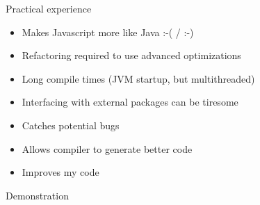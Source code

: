 \documentclass{powerdot}
\begin{document}
\begin{slide}{Practical experience}
\begin{itemize}
\item Makes Javascript more like Java :-( / :-)
\item Refactoring required to use advanced optimizations
\item Long compile times (JVM startup, but multithreaded)
\item Interfacing with external packages can be tiresome
\item Catches potential bugs
\item Allows compiler to generate better code
\item Improves my code
\end{itemize}
\end{slide}

\begin{slide}{Demonstration}
 \\
 \\
\end{slide}
\end{document}
